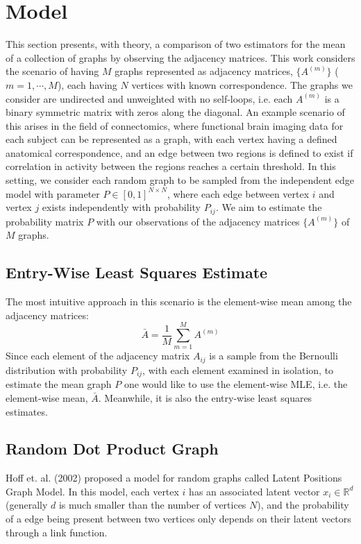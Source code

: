 \section{Model}
This section presents, with theory, a comparison of two estimators for the mean of a collection of graphs by observing the adjacency matrices.  This work considers the scenario of having $M$ graphs represented as adjacency matrices, $\{A^{(m)}\}$ ($m = 1, \cdots, M$), each having $N$ vertices with known correspondence.  The graphs we consider are undirected and unweighted with no self-loops, i.e. each $A^{(m)}$ is a binary symmetric matrix with zeros along the diagonal. An example scenario of this arises in the field of connectomics, where functional brain imaging data for each subject can be represented as a graph, with each vertex having a defined anatomical correspondence, and an edge between two regions is defined to exist if correlation in activity between the regions reaches a certain threshold. In this setting, we consider each random graph to be sampled from the independent edge model with parameter $P \in [0,1]^{N\times N}$, where each edge between vertex $i$ and vertex $j$ exists independently with probability $P_{ij}$. We aim to estimate the probability matrix $P$ with our observations of the adjacency matrices $\{A^{(m)}\}$ of $M$ graphs.



\subsection{Entry-Wise Least Squares Estimate}
The most intuitive approach in this scenario is the element-wise mean among the adjacency matrices:
\begin{equation}
\bar{A} = \frac{1}{M}\sum\limits_{m = 1}^M A^{(m)}
\end{equation}
Since each element of the adjacency matrix $A_{ij}$ is a sample from the Bernoulli distribution with probability $P_{ij}$, with each element examined in isolation, to estimate the mean graph $P$ one would like to use the element-wise MLE, i.e. the element-wise mean, $\bar{A}$. Meanwhile, it is also the entry-wise least squares estimates.



\subsection{Random Dot Product Graph}
Hoff et. al. (2002) \cite{hoff2002latent} proposed a model for random graphs called Latent Positions Graph Model. In this model, each vertex $i$ has an associated latent vector $x_i \in \mathbb{R}^d$ (generally $d$ is much smaller than the number of vertices $N$), and the probability of a edge being present between two vertices only depends on their latent vectors through a link function. 

